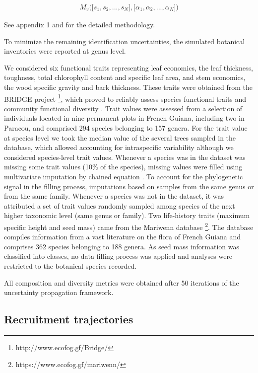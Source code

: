 \documentclass[fleqn,10pt]{ArtEcoFoG} %
\begin{document}
\begin{align}
M_v\Big(\big[s_1, s_2,..., s_N\big],\big[\alpha_1, \alpha_2,..., \alpha_N\big]\Big) \nonumber
\end{align}

See appendix 1 and \citet{Aubry-Kientz2013} for the detailed
methodology.

To minimize the remaining identification uncertainties, the simulated
botanical inventories were reported at genus level.

We considered six functional traits representing leaf economics, the
leaf thickness, toughness, total chlorophyll content and specific leaf
area, and stem economics, the wood specific gravity and bark thickness.
These traits were obtained from the BRIDGE project \footnote{http://www.ecofog.gf/Bridge/},
which proved to reliably assess species functional traits and community
functional diversity \citep{Paine2015}. Trait values were assessed from
a selection of individuals located in nine permanent plots in French
Guiana, including two in Paracou, and comprised 294 species belonging to
157 genera. For the trait value at species level we took the median
value of the several trees sampled in the database, which allowed
accounting for intraspecific variability although we considered
species-level trait values. Whenever a species was in the dataset was
missing some trait values (10\% of the species), missing values were
filled using multivariate imputation by chained equation
\citep{Mice2011}. To account for the phylogenetic signal in the filling
process, imputations based on samples from the same genus or from the
same family. Whenever a species was not in the dataset, it was
attributed a set of trait values randomly sampled among species of the
next higher taxonomic level (same genus or family). Two life-history
traits (maximum specific height and seed mass) came from the Mariwenn
database \footnote{https://www.ecofog.gf/mariwenn/}. The database
compiles information from a vast literature on the flora of French
Guiana \citep{Ollivier2007} and comprises 362 species belonging to 188
genera. As seed mass information was classified into classes, no data
filling process was applied and analyses were restricted to the
botanical species recorded.

All composition and diversity metrics were obtained after 50 iterations
of the uncertainty propagation framework.

\subsection{Recruitment trajectories}\label{recruitment-trajectories}
\end{document}
